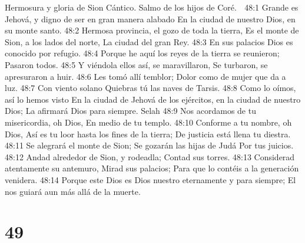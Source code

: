 Hermosura y gloria de Sion 
Cántico. Salmo de los hijos de Coré. 

48:1 Grande es Jehová, y digno de ser en gran manera alabado 
En la ciudad de nuestro Dios, en su monte santo. 
48:2 Hermosa provincia, el gozo de toda la tierra, 
Es el monte de Sion, a los lados del norte, 
La ciudad del gran Rey. 
48:3 En sus palacios Dios es conocido por refugio. 
48:4 Porque he aquí los reyes de la tierra se reunieron; 
Pasaron todos. 
48:5 Y viéndola ellos así, se maravillaron, 
Se turbaron, se apresuraron a huir. 
48:6 Les tomó allí temblor; 
Dolor como de mujer que da a luz. 
48:7 Con viento solano 
Quiebras tú las naves de Tarsis. 
48:8 Como lo oímos, así lo hemos visto 
En la ciudad de Jehová de los ejércitos, en la ciudad de nuestro Dios; 
La afirmará Dios para siempre. Selah 
48:9 Nos acordamos de tu misericordia, oh Dios, 
En medio de tu templo. 
48:10 Conforme a tu nombre, oh Dios, 
Así es tu loor hasta los fines de la tierra; 
De justicia está llena tu diestra. 
48:11 Se alegrará el monte de Sion; 
Se gozarán las hijas de Judá 
Por tus juicios. 
48:12 Andad alrededor de Sion, y rodeadla; 
Contad sus torres. 
48:13 Considerad atentamente su antemuro, 
Mirad sus palacios; 
Para que lo contéis a la generación venidera. 
48:14 Porque este Dios es Dios nuestro eternamente y para siempre; 
El nos guiará aun más allá de la muerte. 

\chapter{49}

